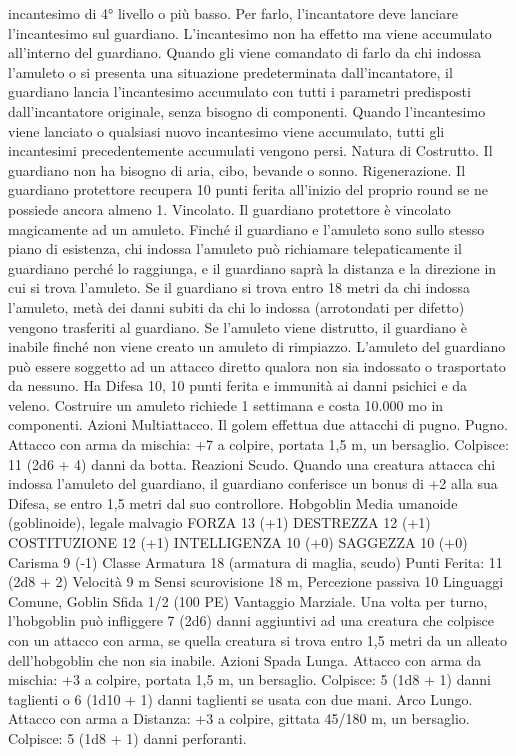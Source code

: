 \begin{multicols}{2}
incantesimo di 4° livello o più basso. Per farlo, l’incantatore deve
lanciare l’incantesimo sul guardiano. L’incantesimo non ha effetto
ma viene accumulato all’interno del guardiano. Quando gli viene
comandato di farlo da chi indossa l’amuleto o si presenta una
situazione predeterminata dall’incantatore, il guardiano lancia
l’incantesimo accumulato con tutti i parametri predisposti
dall’incantatore originale, senza bisogno di componenti. Quando
l’incantesimo viene lanciato o qualsiasi nuovo incantesimo viene
accumulato, tutti gli incantesimi precedentemente accumulati
vengono persi.
Natura di Costrutto. Il guardiano non ha bisogno di aria, cibo,
bevande o sonno.
Rigenerazione. Il guardiano protettore recupera 10 punti ferita
all’inizio del proprio round se ne possiede ancora almeno 1.
Vincolato. Il guardiano protettore è vincolato magicamente ad un
amuleto. Finché il guardiano e l’amuleto sono sullo stesso piano di
esistenza, chi indossa l’amuleto può richiamare telepaticamente il
guardiano perché lo raggiunga, e il guardiano saprà la distanza e la
direzione in cui si trova l’amuleto. Se il guardiano si trova entro 18
metri da chi indossa l’amuleto, metà dei danni subiti da chi lo
indossa (arrotondati per difetto) vengono trasferiti al guardiano. Se
l’amuleto viene distrutto, il guardiano è inabile finché non viene
creato un amuleto di rimpiazzo. L’amuleto del guardiano può essere
soggetto ad un attacco diretto qualora non sia indossato o trasportato
da nessuno. Ha Difesa 10, 10 punti ferita e immunità ai danni psichici e
da veleno. Costruire un amuleto richiede 1 settimana e costa 10.000
mo in componenti.
Azioni
Multiattacco. Il golem effettua due attacchi di pugno.
Pugno. Attacco con arma da mischia: +7 a colpire, portata 1,5
m, un bersaglio.
Colpisce: 11 (2d6 + 4) danni da botta.
Reazioni
Scudo. Quando una creatura attacca chi indossa l’amuleto del
guardiano, il guardiano conferisce un bonus di +2 alla sua Difesa, se
entro 1,5 metri dal suo controllore.
Hobgoblin
Media umanoide (goblinoide), legale malvagio
FORZA 13 (+1)
DESTREZZA 12 (+1)
COSTITUZIONE 12 (+1)
INTELLIGENZA 10 (+0)
SAGGEZZA 10 (+0)
Carisma 9 (-1)
Classe Armatura 18 (armatura di maglia, scudo)
\hspace*{0pt}\hfill{Punti Ferita}: 11 (2d8 + 2)
Velocità 9 m
Sensi scurovisione 18 m, Percezione passiva 10
Linguaggi Comune, Goblin
Sfida 1/2 (100 PE)
Vantaggio Marziale. Una volta per turno, l’hobgoblin può
infliggere 7 (2d6) danni aggiuntivi ad una creatura che colpisce
con un attacco con arma, se quella creatura si trova entro 1,5
metri da un alleato dell’hobgoblin che non sia inabile.
Azioni
Spada Lunga. Attacco con arma da mischia: +3 a colpire,
portata 1,5 m, un bersaglio.
Colpisce: 5 (1d8 + 1) danni taglienti o 6 (1d10 + 1) danni
taglienti se usata con due mani.
Arco Lungo. Attacco con arma a Distanza: +3 a colpire, gittata
45/180 m, un bersaglio.
Colpisce: 5 (1d8 + 1) danni perforanti.
 

\end{multicols}
